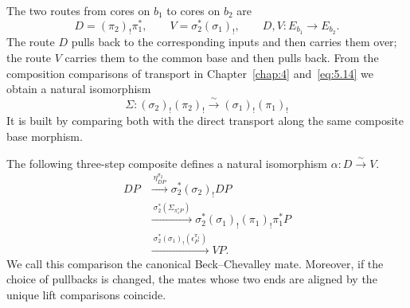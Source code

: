 \begin{construction}
The two routes from cores on $b_1$ to cores on $b_2$ are
\begin{equation*}
D=(\pi_2)_!\pi_1^*,\qquad
V=\sigma_2^*(\sigma_1)_!,\qquad
D,V:E_{b_1}\longrightarrow E_{b_2}.
\tag{5.15}\label{eq:5.15}
\end{equation*}
The route $D$ pulls back to the corresponding inputs and then carries them over; the route
$V$ carries them to the common base and then pulls back. From the composition comparisons of
transport in Chapter~\ref{chap:4} and~\eqref{eq:5.14} we obtain a natural isomorphism
\begin{equation*}
\Sigma:(\sigma_2)_!(\pi_2)_!
\xrightarrow{\sim}(\sigma_1)_!(\pi_1)_!
\tag{5.16}\label{eq:5.16}
\end{equation*}
It is built by comparing both with the direct transport along the same composite base
morphism.

\end{construction}

\begin{theorem}\label{thm:5.11}

The following three-step composite defines a natural isomorphism
$\alpha:D\xrightarrow{\sim}V$.
\begin{equation*}
\begin{aligned}
DP&\xrightarrow{\ \eta^{\sigma_2}_{DP}\ }
 \sigma_2^*(\sigma_2)_!DP\\
&\xrightarrow{\ \sigma_2^*(\Sigma_{\pi_1^*P})\ }
 \sigma_2^*(\sigma_1)_!(\pi_1)_!\pi_1^*P\\
&\xrightarrow{\ \sigma_2^*(\sigma_1)_!(\epsilon^{\pi_1}_P)\ }
 VP.
\end{aligned}
\tag{5.17}\label{eq:5.17}
\end{equation*}
We call this comparison the canonical Beck--Chevalley mate. Moreover, if the choice of
pullbacks is changed, the mates whose two ends are aligned by the unique lift comparisons
coincide.

\end{theorem}

